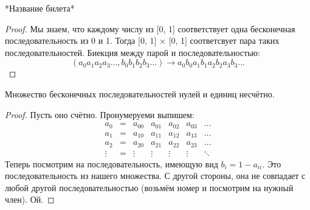 
\begin{theorem} \thmslashn

	*Название билета*
	\begin{proof} \thmslashn
	
		Мы знаем, что каждому числу из [0, 1] соответствует одна бесконечная последовательность из 0 и 1. Тогда [0, 1] × [0, 1] соответсвует пара таких последовательностей. Биекция между парой и последовательностью:
		$$(a_0a_1a_2a_3\ldots, b_0b_1b_2b_3\ldots) \rightarrow a_0b_0a_1b_1a_2b_2a_3b_3...$$
	\end{proof}
\end{theorem}


\begin{theorem} \thmslashn

	 Множество бесконечных последовательностей нулей и единиц несчётно.
	\begin{proof} \thmslashn
	
		Пусть оно счётно. Пронумеруеми выпишем:
		\begin{equation*}
			\begin{matrix}
				a_0 & = & a_{00} & a_{01} & a_{02} & a_{03} & \ldots \\
				a_1 & = & a_{10} & a_{11} & a_{12} & a_{13} & \ldots \\
				a_2 & = & a_{20} & a_{21} & a_{22} & a_{23} & \ldots \\
				\vdots & = & \vdots & \vdots & \vdots & \vdots & \ddots 
			\end{matrix}
		\end{equation*}
		Теперь посмотрим на последовательность, имеющую вид $b_i = 1 - a_{ii}$. Это последовательность из нашего множества. С другой стороны, она не совпадает с любой другой последовательностью (возьмём номер и посмотрим на нужный член). Ой.
	\end{proof}
\end{theorem}




